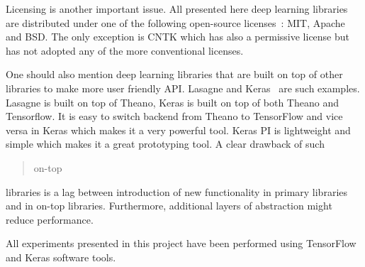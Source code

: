 \documentclass[a4paper, 11pt, table]{article}
\begin{document}
Licensing is another important issue. All presented here deep learning libraries are distributed under one of the following open-source licenses~\cite{Rosen:2004:OSL:1014911}: MIT, Apache and BSD. The only exception is CNTK which has also a permissive license but has not adopted any of the more conventional licenses.

One should also mention deep learning libraries that are built on top of other libraries to make more user friendly API. Lasagne and Keras~\cite{chollet2015keras} are such examples. Lasagne is built on top of Theano, Keras is built on top of both Theano and Tensorflow. It is easy to switch backend from Theano to TensorFlow and vice versa in Keras which makes it a very powerful tool. Keras PI is lightweight and simple which makes it a great prototyping tool. A clear drawback of such \blockquote{on-top} libraries is a lag between introduction of new functionality in primary libraries and in on-top libraries. Furthermore, additional layers of abstraction might reduce performance. 

All experiments presented in this project have been performed using TensorFlow and Keras software tools. 
\end{document}
